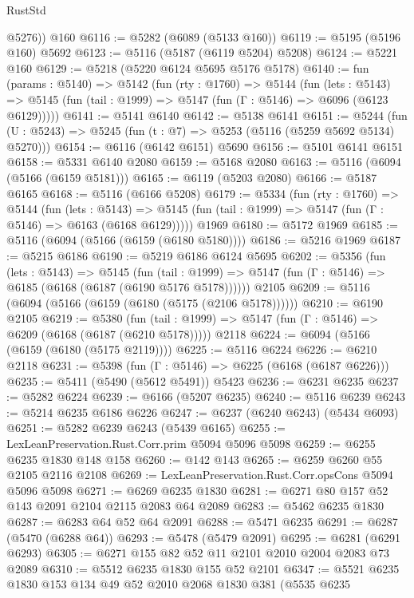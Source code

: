\begin{lexlean}{RustStd}
\begin{coremodule}
        @5276))
    @160
@6116 := @5282 (@6089 (@5133 @160))
@6119 := @5195 (@5196 @160) @5692
@6123 := @5116 (@5187 (@6119 @5204) @5208)
@6124 := @5221 @160
@6129 := @5218 (@5220 @6124 @5695 @5176 @5178)
@6140 := fun (params : @5140) =>
  @5142
    (fun (rty : @1760) =>
    @5144
      (fun (lets : @5143) =>
      @5145 (fun (tail : @1999) => @5147 (fun (Γ : @5146) => @6096 (@6123 @6129)))))
@6141 := @5141 @6140
@6142 := @5138 @6141
@6151 := @5244 (fun (U : @5243) => @5245 (fun (t : @7) => @5253 (@5116 (@5259 @5692 @5134) @5270)))
@6154 := @6116 (@6142 @6151) @5690
@6156 := @5101 @6141 @6151
@6158 := @5331 @6140 @2080
@6159 := @5168 @2080
@6163 := @5116 (@6094 (@5166 (@6159 @5181)))
@6165 := @6119 (@5203 @2080)
@6166 := @5187 @6165
@6168 := @5116 (@6166 @5208)
@6179 := @5334
    (fun (rty : @1760) =>
    @5144
      (fun (lets : @5143) =>
      @5145 (fun (tail : @1999) => @5147 (fun (Γ : @5146) => @6163 (@6168 @6129)))))
    @1969
@6180 := @5172 @1969
@6185 := @5116 (@6094 (@5166 (@6159 (@6180 @5180))))
@6186 := @5216 @1969
@6187 := @5215 @6186
@6190 := @5219 @6186 @6124 @5695
@6202 := @5356
    (fun (lets : @5143) =>
    @5145
      (fun (tail : @1999) => @5147 (fun (Γ : @5146) => @6185 (@6168 (@6187 (@6190 @5176 @5178))))))
    @2105
@6209 := @5116 (@6094 (@5166 (@6159 (@6180 (@5175 (@2106 @5178))))))
@6210 := @6190 @2105
@6219 := @5380
    (fun (tail : @1999) => @5147 (fun (Γ : @5146) => @6209 (@6168 (@6187 (@6210 @5178)))))
    @2118
@6224 := @6094 (@5166 (@6159 (@6180 (@5175 @2119))))
@6225 := @5116 @6224
@6226 := @6210 @2118
@6231 := @5398 (fun (Γ : @5146) => @6225 (@6168 (@6187 @6226)))
@6235 := @5411 (@5490 (@5612 @5491)) @5423
@6236 := @6231 @6235
@6237 := @5282 @6224
@6239 := @6166 (@5207 @6235)
@6240 := @5116 @6239
@6243 := @5214 @6235 @6186 @6226
@6247 := @6237 (@6240 @6243) (@5434 @6093)
@6251 := @5282 @6239 @6243 (@5439 @6165)
@6255 := LexLeanPreservation.Rust.Corr.prim @5094 @5096 @5098
@6259 := @6255 @6235 @1830 @148 @158
@6260 := @142 @143
@6265 := @6259 @6260 @55 @2105 @2116 @2108
@6269 := LexLeanPreservation.Rust.Corr.opsCons @5094 @5096 @5098
@6271 := @6269 @6235 @1830
@6281 := @6271 @80 @157 @52 @143 @2091 @2104 @2115 @2083 @64 @2089
@6283 := @5462 @6235 @1830
@6287 := @6283 @64 @52 @64 @2091
@6288 := @5471 @6235
@6291 := @6287 (@5470 (@6288 @64))
@6293 := @5478 (@5479 @2091)
@6295 := @6281 (@6291 @6293)
@6305 := @6271 @155 @82 @52 @11 @2101 @2010 @2004 @2083 @73 @2089
@6310 := @5512 @6235 @1830 @155 @52 @2101
@6347 := @5521
    @6235
    @1830
    @153
    @134
    @49
    @52
    @2010
    @2068
    @1830
    @381
    (@5535
      @6235

\end{coremodule}
\end{lexlean}
